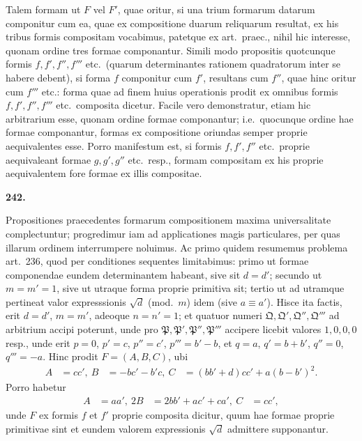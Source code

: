 \documentclass[12pt,a4paper]{article}
\theoremstyle{plain}
\theoremstyle{definition}
\theoremstyle{remark}
\begin{document}
Talem formam ut $F$ vel $F'$, quae oritur, si una trium formarum datarum componitur cum ea, quae ex compositione duarum reliquarum resultat, ex his tribus formis compositam vocabimus, patetque ex art.\ praec., nihil hic interesse, quonam ordine tres formae componantur. Simili modo propositis quotcunque formis $f, f', f'', f'''$ etc.\ (quarum determinantes rationem quadratorum inter se habere debent), si forma $f$ componitur cum $f'$, resultans cum $f''$, quae hinc oritur cum $f'''$ etc.: forma quae ad finem huius operationis prodit ex omnibus formis $f, f', f'', f'''$ etc.\ composita dicetur. Facile vero demonstratur, etiam hic arbitrarium esse, quonam ordine formae componantur; i.e.\ quocunque ordine hae formae componantur, formas ex compositione oriundas semper proprie aequivalentes esse. Porro manifestum est, si formis $f, f', f''$ etc.\ proprie aequivaleant formae $g, g', g''$ etc.\ resp., formam compositam ex his proprie aequivalentem fore formae ex illis compositae.

\begin{center}\textbf{242.}\end{center}

Propositiones praecedentes formarum compositionem maxima universalitate complectuntur; progredimur iam ad applicationes magis particulares, per quas illarum ordinem interrumpere noluimus. Ac primo quidem resumemus problema art.\ 236, quod per conditiones sequentes limitabimus: primo ut formae componendae eundem determinantem habeant, sive sit $d = d'$; secundo ut $m = m' = 1$, sive ut utraque forma proprie primitiva sit; tertio ut ad utramque pertineat valor expresssionis $\sqrt{d}$ (mod.\ $m$) idem (sive $a \equiv a'$). Hisce ita factis, erit $d = d'$, $m = m'$, adeoque $n = n' = 1$; et quatuor numeri $\mathfrak{Q}, \mathfrak{Q}', \mathfrak{Q}'', \mathfrak{Q}'''$ ad arbitrium accipi poterunt, unde pro $\mathfrak{P}, \mathfrak{P}', \mathfrak{P}'', \mathfrak{P}'''$ accipere licebit valores $1, 0, 0, 0$ resp., unde erit $p = 0$, $p' = c$, $p'' = c'$, $p''' = b' - b$, et $q = a$, $q' = b + b'$, $q'' = 0$, $q''' = -a$. Hinc prodit $F = (A, B, C)$, ubi
\begin{align*}
A &= cc', \
B &= -bc' - b'c, \
C &= (bb' + d)cc' + a(b - b')^{2}.
\end{align*}
Porro habetur
\begin{align*}
A &= aa', \
2B &= 2bb' + ac' + ca', \
C &= cc',
\end{align*}
unde $F$ ex formis $f$ et $f'$ proprie composita dicitur, quum hae formae proprie primitivae sint et eundem valorem expressionis $\sqrt{d}$ admittere supponantur.
\end{document}

